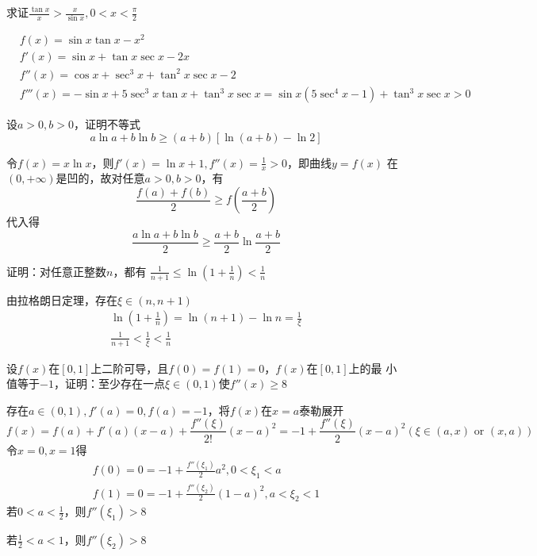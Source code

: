\documentclass{article}
\begin{document}
\begin{examplle}[]
求证\(\frac{\tan x}{x}>\frac{x}{\sin x},0<x<\frac{\pi}{2}\)

\begin{align*}
&f(x)=\sin x\tan x-x^2\\
&f'(x)=\sin x+\tan x\sec x-2x\\
&f''(x)=\cos x+\sec^3x+\tan^2x\sec x-2\\
&f'''(x)=-\sin x+5\sec^3x\tan x+\tan^3x\sec x=
\sin x(5\sec^4x-1)+\tan^3x\sec x>0
\end{align*}
\end{examplle}

\begin{examplle}[]
设\(a>0,b>0\)，证明不等式
\begin{equation*}
a\ln a+b\ln b\ge(a+b)[\ln(a+b)-\ln2]
\end{equation*}

令\(f(x)=x\ln x\)，则\(f'(x)=\ln x+1,f''(x)=\frac{1}{x}>0\)，即曲线\(y=f(x)\)
在\((0,+\infty)\)是凹的，故对任意\(a>0,b>0\)，有
\begin{equation*}
\frac{f(a)+f(b)}{2}\ge f(\frac{a+b}{2})
\end{equation*}
代入得
\begin{equation*}
\frac{a\ln a+b\ln b}{2}\ge\frac{a+b}{2}\ln\frac{a+b}{2}
\end{equation*}
\end{examplle}

\begin{examplle}[]
证明：对任意正整数\(n\)，都有
\(\frac{1}{n+1}\le\ln(1+\frac{1}{n})<\frac{1}{n}\)

由拉格朗日定理，存在\(\xi\in(n,n+1)\)
\begin{gather*}
\ln(1+\frac{1}{n})=\ln(n+1)-\ln n=\frac{1}{\xi}\\
\frac{1}{n+1}<\frac{1}{\xi}<\frac{1}{n}
\end{gather*}
\end{examplle}

\begin{examplle}[]
设\(f(x)\)在\([0,1]\)上二阶可导，且\(f(0)=f(1)=0\)，\(f(x)\)在\([0,1]\)上的最
小值等于\(-1\)，证明：至少存在一点\(\xi\in(0,1)\)使\(f''(x)\ge8\)

存在\(a\in(0,1),f'(a)=0,f(a)=-1\)，将\(f(x)\)在\(x=a\)泰勒展开
\begin{equation*}
f(x)=f(a)+f'(a)(x-a)+\frac{f''(\xi)}{2!}(x-a)^2=-1+\frac{f''(\xi)}{2}(x-a)^2(\xi\in(a,x)\text{ or }(x,a))
\end{equation*}
令\(x=0,x=1\)得
\begin{gather*}
f(0)=0=-1+\frac{f''(\xi_1)}{2}a^2,0<\xi_1<a\\
f(1)=0=-1+\frac{f''(\xi_2)}{2}(1-a)^2,a<\xi_2<1
\end{gather*}
若\(0<a<\frac{1}{2}\)，则\(f''(\xi_1)>8\)


若\(\frac{1}{2}<a<1\)，则\(f''(\xi_2)>8\)
\end{examplle}
\end{document}
